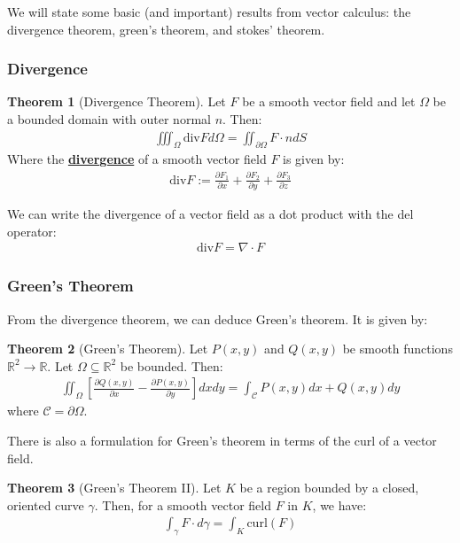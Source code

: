 \documentclass[11pt]{scrartcl}
\newcommand{\R}[0]{\mathbb{R}}
\theoremstyle{definition}
\newtheorem{theorem}{Theorem}
\theoremstyle{remark}
\newcommand{\dfn}[1]{\textbf{\underline{#1}}}
\newcommand{\idx}[2]{\int_{#1}^{#2}}
\begin{document}
{We will state some basic (and important) results from vector calculus: the divergence theorem, green's theorem, and stokes' theorem. 
\subsubsection{Divergence}
\begin{theorem}[Divergence Theorem]
Let $F$ be a smooth vector field and let $\Omega$ be a bounded domain with outer normal $n$. Then: 
\begin{align}
	\iiint_{\Omega} \text{div}F d \Omega = \iint_{\partial \Omega} F \cdot n dS	
\end{align}
Where the \dfn{divergence} of a smooth vector field $F$ is given by: 
\begin{align*}
	\text{div} F := \frac{\partial F_1}{\partial x} + \frac{\partial F_2}{\partial y} + \frac{\partial F_3}{\partial z}
\end{align*}
\end{theorem}
We can write the divergence of a vector field as a dot product with the del operator: 
\begin{align*}
	\text{div} F = \nabla \cdot F 
\end{align*}

\subsubsection{Green's Theorem}
From the divergence theorem, we can deduce Green's theorem. It is given by: 
\begin{theorem}[Green's Theorem]
	Let $P(x,y)$ and $Q(x,y)$ be smooth functions $\R^2 \rightarrow \R$. Let $\Omega \subseteq \R^2$ be bounded. Then: 
	\begin{align}
		\iint_\Omega \left[ 	\frac{\partial Q(x,y)}{\partial x} - \frac{\partial P(x,y)}{\partial y}	\right] dx dy = \idx{\mathcal{C}}{} P(x,y)dx + Q(x,y)dy	
	\end{align}
	where $\mathcal{C} = \partial \Omega$. 
\end{theorem}

There is also a formulation for Green's theorem in terms of the curl of a vector field. 

\begin{theorem}[Green's Theorem II]
	Let $K$ be a region bounded by a closed, oriented curve $\gamma$. Then, for a smooth vector field $F$ in $K$, we have: 
	\begin{align}
		\idx{\gamma}{} F \cdot d \gamma = \idx{K}{} \text{curl}(F) 	
	\end{align}
\end{theorem}

}
\end{document}
